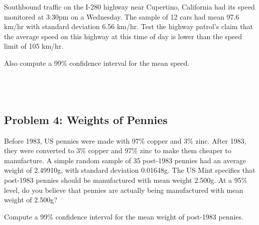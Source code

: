 \documentclass[]{article}
\begin{document}
Southbound traffic on the I-280 highway near Cupertino, California had
its speed monitored at 3:30pm on a Wednesday. The sample of 12 cars had
mean 97.6 km/hr with standard deviation 6.56 km/hr. Test the highway
patrol's claim that the average speed on this highway at this time of
day is lower than the speed limit of 105 km/hr.

Also compute a 99\% confidence interval for the mean speed.

\hypertarget{section-4}{%
\subsection{\texorpdfstring{\(\;\)}{\textbackslash{};}}\label{section-4}}

\hypertarget{section-5}{%
\subsection{\texorpdfstring{\(\;\)}{\textbackslash{};}}\label{section-5}}

\hypertarget{problem-4-weights-of-pennies}{%
\subsection{Problem 4: Weights of
Pennies}\label{problem-4-weights-of-pennies}}

Before 1983, US pennies were made with 97\% copper and 3\% zinc. After
1983, they were converted to 3\% copper and 97\% zinc to make them
cheaper to manufacture. A simple random sample of 35 post-1983 pennies
had an average weight of 2.49910g, with standard deviation 0.01648g. The
US Mint specifies that post-1983 pennies should be manufactured with
mean weight 2.500g. At a 95\% level, do you believe that pennies are
actually being manufactured with mean weight of 2.500g?

Compute a 99\% confidence interval for the mean weight of post-1983
pennies.

\hypertarget{section-6}{%
\subsection{\texorpdfstring{\(\;\)}{\textbackslash{};}}\label{section-6}}

\hypertarget{section-7}{%
\subsection{\texorpdfstring{\(\;\)}{\textbackslash{};}}\label{section-7}}
\end{document}
